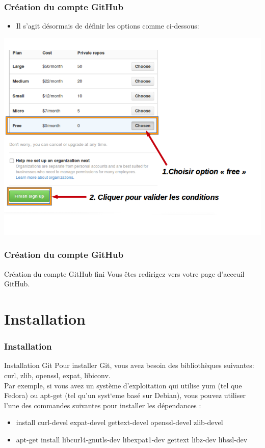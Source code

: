 \documentclass{beamer}
\begin{document}
\begin{frame}
\frametitle{Cr\'eation du compte GitHub}
\begin{itemize}
\item Il s'agit d\'{e}sormais de d\'{e}finir les options comme ci-dessous:
\end{itemize}
\includegraphics[scale=0.3]{GitHubfininsc.png}
\end{frame}

\begin{frame}
\frametitle{Cr\'eation du compte GitHub}
\begin{block}{Cr\'eation du compte GitHub fini}
Vous \^{e}tes redirigez vers votre page d'acceuil GitHub.
\end{block}
\end{frame}

\section{Installation}
\begin{frame}
\frametitle{Installation}
\begin{block}{Installation Git}
Pour installer Git, vous avez besoin des biblioth\`{e}ques suivantes: curl, zlib, openssl, expat, libiconv.\\ Par exemple, si vous avez un syst\`{e}me d'exploitation qui utilise yum (tel que Fedora) ou apt-get (tel qu'un syst`{e}me bas\'{e} sur Debian), vous pouvez utiliser l'une des commandes suivantes pour installer les d\'{e}pendances :
\begin{itemize}
\item install curl-devel expat-devel gettext-devel 
  openssl-devel zlib-devel

\item apt-get install libcurl4-gnutls-dev libexpat1-dev gettext 
  libz-dev libssl-dev
\end{itemize}
\end{block}
\end{frame}
\end{document}
